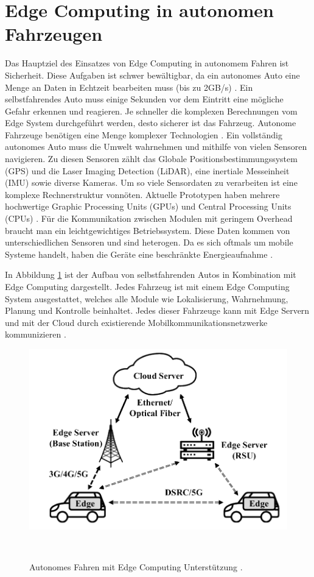 \documentclass{sigchi}
\begin{document}
\section{Edge Computing in autonomen Fahrzeugen} \label{chap:edge-computing-autonomic-cars}
Das Hauptziel des Einsatzes von Edge Computing in autonomem Fahren ist Sicherheit. Diese Aufgaben ist schwer bewältigbar, da ein autonomes Auto eine Menge an Daten in Echtzeit bearbeiten muss (bis zu 2GB/s) \cite{architectures:2017}. Ein selbstfahrendes Auto muss einige Sekunden vor dem Eintritt eine mögliche Gefahr erkennen und reagieren. Je schneller die komplexen Berechnungen vom Edge System durchgeführt werden, desto sicherer ist das Fahrzeug. Autonome Fahrzeuge benötigen eine Menge komplexer Technologien \cite{opportunities-challenges:2019}.
Ein vollständig autonomes Auto muss die Umwelt wahrnehmen und mithilfe von vielen Sensoren navigieren. Zu diesen Sensoren zählt das Globale Positionsbestimmungssystem (GPS) und die Laser Imaging Detection (LiDAR), eine inertiale Messeinheit (IMU) sowie diverse Kameras. Um so viele Sensordaten zu verarbeiten ist eine komplexe Rechnerstruktur vonnöten. Aktuelle Prototypen haben mehrere hochwertige Graphic Processing Units (GPUs) und Central Processing Units (CPUs) \cite{architectures:2017}. Für die Kommunikation zwischen Modulen mit geringem Overhead braucht man ein leichtgewichtiges Betriebssystem. Diese Daten kommen von unterschiedlichen Sensoren und sind heterogen. Da es sich oftmals um mobile Systeme handelt, haben die Geräte eine beschränkte Energieaufnahme \cite{opportunities-challenges:2019}. 

In Abbildung \ref{fig:edge-computing-drive-infrastructure} ist der Aufbau von selbstfahrenden Autos in Kombination mit Edge Computing dargestellt. Jedes Fahrzeug ist mit einem Edge Computing System ausgestattet, welches alle Module wie Lokalisierung, Wahrnehmung, Planung und Kontrolle beinhaltet. Jedes dieser Fahrzeuge kann mit Edge Servern und mit der Cloud durch existierende Mobilkommunikationsnetzwerke kommunizieren \cite{opportunities-challenges:2019}.

\begin{figure}
\centering
  \includegraphics[width=0.70\columnwidth]{figures/edge-computing-drive-infrastructure.PNG}
  \caption{Autonomes Fahren mit Edge Computing Unterstützung \cite{opportunities-challenges:2019}.}~\label{fig:edge-computing-drive-infrastructure}
\end{figure}
\end{document}
